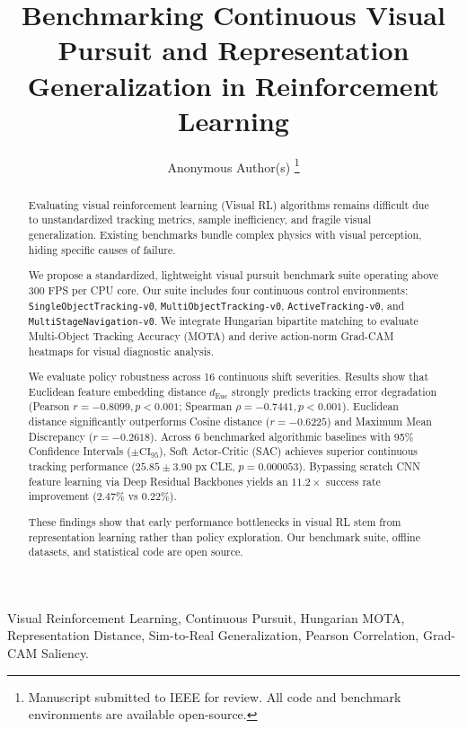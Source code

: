 \documentclass[journal]{IEEEtran}
\begin{document}
\title{Benchmarking Continuous Visual Pursuit and Representation Generalization in Reinforcement Learning}

\author{Anonymous Author(s)
\thanks{Manuscript submitted to IEEE for review. All code and benchmark environments are available open-source.}}

\maketitle

\begin{abstract}
Evaluating visual reinforcement learning (Visual RL) algorithms remains difficult due to unstandardized tracking metrics, sample inefficiency, and fragile visual generalization. Existing benchmarks bundle complex physics with visual perception, hiding specific causes of failure.

We propose a standardized, lightweight visual pursuit benchmark suite operating above 300 FPS per CPU core. Our suite includes four continuous control environments: \texttt{SingleObjectTracking-v0}, \texttt{MultiObjectTracking-v0}, \texttt{ActiveTracking-v0}, and \texttt{MultiStageNavigation-v0}. We integrate Hungarian bipartite matching to evaluate Multi-Object Tracking Accuracy (MOTA) and derive action-norm Grad-CAM heatmaps for visual diagnostic analysis.

We evaluate policy robustness across 16 continuous shift severities. Results show that Euclidean feature embedding distance $d_{\text{Euc}}$ strongly predicts tracking error degradation (Pearson $r = -0.8099, p < 0.001$; Spearman $\rho = -0.7441, p < 0.001$). Euclidean distance significantly outperforms Cosine distance ($r = -0.6225$) and Maximum Mean Discrepancy ($r = -0.2618$). Across 6 benchmarked algorithmic baselines with 95\% Confidence Intervals ($\pm \text{CI}_{95}$), Soft Actor-Critic (SAC) achieves superior continuous tracking performance ($25.85 \pm 3.90$ px CLE, $p = 0.000053$). Bypassing scratch CNN feature learning via Deep Residual Backbones yields an $11.2\times$ success rate improvement ($2.47\%$ vs $0.22\%$).

These findings show that early performance bottlenecks in visual RL stem from representation learning rather than policy exploration. Our benchmark suite, offline datasets, and statistical code are open source.
\end{abstract}

\begin{IEEEkeywords}
Visual Reinforcement Learning, Continuous Pursuit, Hungarian MOTA, Representation Distance, Sim-to-Real Generalization, Pearson Correlation, Grad-CAM Saliency.
\end{IEEEkeywords}
\end{document}

